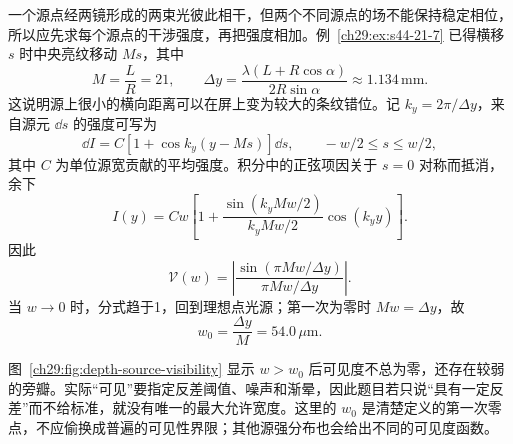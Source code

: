 \begin{xesolution}
一个源点经两镜形成的两束光彼此相干，但两个不同源点的场不能保持稳定相位，所以应先求每个源点的干涉强度，再把强度相加。例~\ref{ch29:ex:s44-21-7} 已得横移 $s$ 时中央亮纹移动 $Ms$，其中
\[
 M=\frac LR=21,\qquad
 \Delta y=\frac{\lambda(L+R\cos\alpha)}{2R\sin\alpha}
 \approx1.134\,\mathrm{mm}.
\]
这说明源上很小的横向距离可以在屏上变为较大的条纹错位。记 $k_y=2\pi/\Delta y$，来自源元 $\dd s$ 的强度可写为
\[
 \dd I=C[1+\cos k_y(y-Ms)]\dd s,
 \qquad -w/2\le s\le w/2,
\]
其中 $C$ 为单位源宽贡献的平均强度。积分中的正弦项因关于 $s=0$ 对称而抵消，余下
\[
 I(y)=Cw\left[1+
 \frac{\sin(k_yMw/2)}{k_yMw/2}\cos(k_yy)\right].
\]
因此
\begin{equation}\label{ch29:eq:depth-source-visibility}
 \boxed{\mathcal V(w)=\left|\frac{\sin(\pi Mw/\Delta y)}{\pi Mw/\Delta y}\right|}.
\end{equation}
当 $w\to0$ 时，分式趋于1，回到理想点光源；第一次为零时 $Mw=\Delta y$，故
\[
 \boxed{w_0=\frac{\Delta y}{M}=54.0\,\mu\mathrm m}.
\]

\begin{center}\begin{minipage}{\linewidth}\centering
{}
\end{minipage}\end{center}

图~\ref{ch29:fig:depth-source-visibility} 显示 $w>w_0$ 后可见度不总为零，还存在较弱的旁瓣。实际“可见”要指定反差阈值、噪声和渐晕，因此题目若只说“具有一定反差”而不给标准，就没有唯一的最大允许宽度。这里的 $w_0$ 是清楚定义的第一次零点，不应偷换成普遍的可见性界限；其他源强分布也会给出不同的可见度函数。
\end{xesolution}


